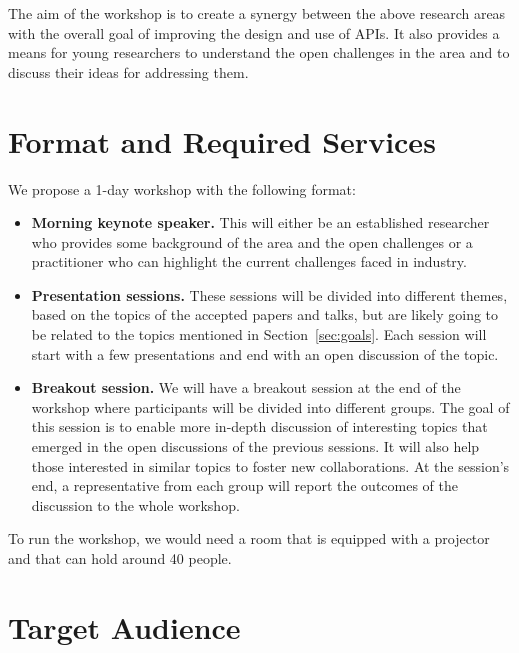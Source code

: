 \documentclass[10pt, conference]{IEEEtran}
\begin{document}
The aim of the workshop is to create a synergy between the above research areas with the overall goal of improving the design and use of APIs. It also provides a means for young researchers to understand the open challenges in the area and to discuss their ideas for addressing them.

\section{Format and Required Services}

We propose a 1-day workshop with the following format:

\begin{itemize}
\setlength\itemsep{5pt}
\item \textbf{Morning keynote speaker.} This will either be an established researcher who provides some background of the area and the open challenges or a practitioner who can highlight the current challenges faced in industry.
\item \textbf{Presentation sessions.} These sessions will be divided into different themes, based on the topics of the accepted papers and talks, but are likely going to be related to the topics mentioned in Section~\ref{sec:goals}. Each session will start with a few presentations and end with an open discussion of the topic. 
\item \textbf{Breakout session.} We will have a breakout session at the end of the workshop where participants will be divided into different groups. The goal of this session is to enable more in-depth discussion of interesting topics that emerged in the open discussions of the previous sessions. It will also help those interested in similar topics to foster new collaborations. At the session's end, a representative from each group will report the outcomes of the discussion to the whole workshop.
\end{itemize}

To run the workshop, we would need a room that is equipped with a projector and that can hold around 40 people.

\section{Target Audience}
\end{document}
